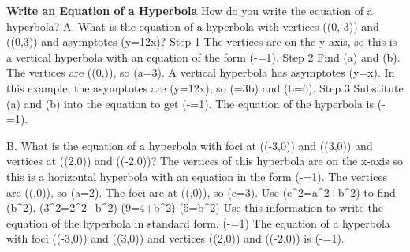 \documentclass{article}
\newenvironment{example}[1]{}{}         %
\newcommand{\answer}[1]{}               %
\newcommand{\placeholder}[2]{}          %
\newcommand{\te}[1]{}                   %
\begin{document}
\begin{example}{3}
\textbf{Write an Equation of a Hyperbola}
How do you write the equation of a hyperbola?
A. What is the equation of a hyperbola with vertices ((0,-3)) and ((0,3)) and asymptotes (y=\pm\frac12x)?
Step 1 The vertices are on the y-axis, so this is a vertical hyperbola with an equation of the form (-=1).
Step 2 Find (a) and (b). The vertices are ((0,)), so (a=3).
A vertical hyperbola has asymptotes (y=\pm{}x).
In this example, the asymptotes are (y=\pm\frac12x), so (=\frac3b) and (b=6).
Step 3 Substitute (a) and (b) into the equation to get (-=1).
The equation of the hyperbola is (-=1).
\placeholder{graph}{Grid spacing 2, black double-arrow x/y axes O origin, labels +/-4,+/-8, window [-10,10] both axes. Red vertical hyperbola vertices (0,+/-3), arrows on branch ends. Blue solid asymptotes through origin labeled y=x/2 and y=-x/2, arrowheads.}
\te{Callout: While it is not essential to sketch the graph, it may help guide your writing of the equation for a hyperbola.}
\te{COMMON ERROR Always remember to check if the transverse axis is horizontal or vertical. For a hyperbola centered at the origin, if the vertices are on the horizontal axis, the equation will be in the form of (\frac{x^2}{a^2}-\frac{y^2}{b^2}=1). If the vertices are on the vertical axis, the equation will be in the form of (\frac{y^2}{a^2}-\frac{x^2}{b^2}=1).}
\answer{A. (\frac{y^2}{9}-\frac{x^2}{36}=1)}
B. What is the equation of a hyperbola with foci at ((-3,0)) and ((3,0)) and vertices at ((2,0)) and ((-2,0))?
The vertices of this hyperbola are on the x-axis so this is a horizontal hyperbola with an equation in the form (-=1).
The vertices are ((,0)), so (a=2).
The foci are at ((,0)), so (c=3).
Use (c^2=a^2+b^2) to find (b^2).
(3^2=2^2+b^2)
(9=4+b^2)
(5=b^2)
Use this information to write the equation of the hyperbola in standard form.
(-=1)
The equation of a hyperbola with foci ((-3,0)) and ((3,0)) and vertices ((2,0)) and ((-2,0)) is (-=1).
\placeholder{graph}{Unit grid [-5,5] both axes, black x/y axes arrows, O origin and labels +/-2,+/-4. Red horizontal hyperbola with arrows and filled vertices (+/-2,0); blue filled foci (+/-3,0). No asymptotes drawn.}
\te{HAVE A GROWTH MINDSET When it takes time to learn something new, how do you stick with it?}
\answer{B. (\frac{x^2}{4}-\frac{y^2}{5}=1)}
\end{example}
\end{document}

